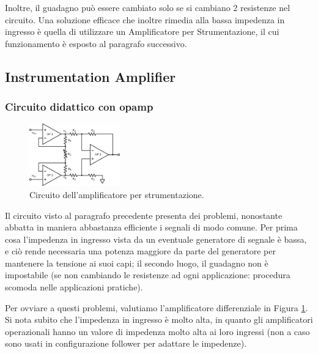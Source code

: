 Inoltre, il guadagno può essere cambiato solo se si cambiano 2 resistenze nel circuito. Una soluzione efficace che inoltre rimedia alla bassa impedenza in ingresso è quella di utilizzare un Amplificatore per Strumentazione, il cui funzionamento è esposto al paragrafo successivo.

\subsection{Instrumentation Amplifier}

\subsubsection*{Circuito didattico con opamp}

\begin{figure}
  \begin{center}
    \includegraphics[width=0.350\textwidth]{../E05/latex/c_INA.pdf}
  \end{center}
  \caption{Circuito dell'amplificatore per strumentazione.}
  \label{cir5:instr_amplif}
\end{figure}

Il circuito visto al paragrafo precedente presenta dei problemi, nonostante abbatta in maniera abbastanza efficiente i segnali di modo comune. Per prima cosa l'impedenza in ingresso vista da un eventuale generatore di segnale è bassa, e ciò rende necessaria una potenza maggiore da parte del generatore per mantenere la tensione ai suoi capi; il secondo luogo, il guadagno non è impostabile (se non cambiando le resistenze ad ogni applicazione: procedura scomoda nelle applicazioni pratiche).

Per ovviare a questi problemi, valutiamo l'amplificatore differenziale in Figura \ref{cir5:instr_amplif}. Si nota subito che l'impedenza in ingresso è molto alta, in quanto gli amplificatori operazionali hanno un valore di impedenza molto alta ai loro ingressi (non a caso sono usati in configurazione follower per adattare le impedenze).

